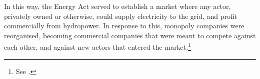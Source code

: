 In this way, the Energy Act served to establish a market where any actor, privately owned or otherwise, could supply electricity to the grid, and profit commercially from hydropower. In response to this, monopoly companies were reorganised, becoming commercial companies that were meant to compete against each other, and against new actors that entered the market.\footnote{See \cite{claes11}.} %
